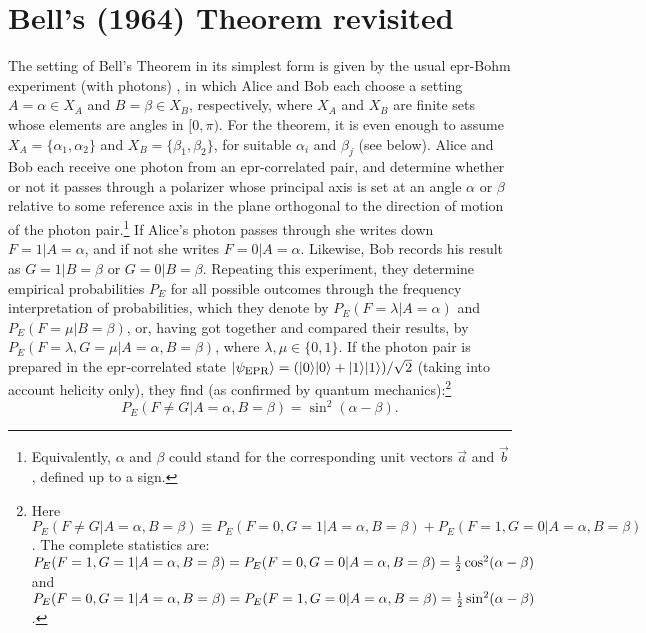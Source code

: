 \documentclass[11pt]{article}
\newcommand{\epr}{{\sc epr}}
\newcommand{\half}{\mbox{\footnotesize $\frac{1}{2}$}}
\newcommand{\qm}{quantum mechanics}
\newcommand{\al}{\alpha} \newcommand{\bt}{L\beta}
\newcommand{\lm}{\lambda} \newcommand{\Lm}{\Lambda}
\begin{document}
\section{Bell's (1964) Theorem revisited}\label{BTsec}
The setting of Bell's Theorem in its simplest form is given by the usual \epr-Bohm experiment (with photons) \cite{Bub}, in which Alice and Bob each choose a setting $A=\al\in X_A$ and $B=\beta\in X_B$, respectively, where $X_A$ and $X_B$ are finite sets whose elements are angles  in $[0,\pi)$. For the theorem, it is even enough to assume $X_A=\{\al_1,\al_2\}$ and $X_B=\{\beta_1,\beta_2\}$, for suitable $\al_i$ and $\beta_j$ (see below). Alice and Bob each receive one photon from an \epr-correlated pair, and determine whether or not it passes through a polarizer whose principal axis is set at an angle $\al$ or $\beta$ relative to some reference axis in the plane orthogonal to the direction of motion of the photon pair.\footnote{Equivalently, $\al$ and $\beta$ could stand for the corresponding unit vectors $\vec{a}$ and $\vec{b}$, defined up to a  sign.} If Alice's photon passes through she writes down $F=1|A=\al$, and if not she writes $F=0|A=\al$. Likewise, Bob records his result as $G=1|B=\beta$ or $G=0|B=\beta$. Repeating this experiment, they determine empirical probabilities $P_E$ for all possible outcomes through the frequency interpretation of probabilities, which they denote by $P_E(F=\lm|A=\al)$ and $P_E(F=\mu|B=\beta)$,
or, having got together and compared their results, by $P_E(F=\lm,G=\mu|A=\al,B=\beta)$, where $\lm,\mu\in\{0,1\}$. 
If the photon pair is prepared in the \epr-correlated state $|\psi_{\mbox{\sc epr}}\rangle=(|0\rangle|0\rangle+|1\rangle|1\rangle)/\sqrt{2}$ (taking into account  helicity only), they find (as confirmed by \qm):\footnote{\label{fn7} Here $P_E(F\neq G|A=\al,B=\beta)\equiv P_E(F=0,G=1|A=\al,B=\beta)+P_E(F=1,G=0|A=\al,B=\beta)$. The complete statistics are: $P_E(F=1,G=1|A=\al,B=\beta)=P_E(F=0,G=0|A=\al,B=\beta)=\half \cos^2(\al-\beta)$ and $P_E(F=0,G=1|A=\al,B=\beta)=P_E(F=1,G=0|A=\al,B=\beta)=\half \sin^2(\al-\beta)$.} 
\begin{equation}
P_E(F\neq G|A=\al,B=\beta)=\sin^2(\al-\beta).\label{uitkomstEPR}
\end{equation}
\end{document}
